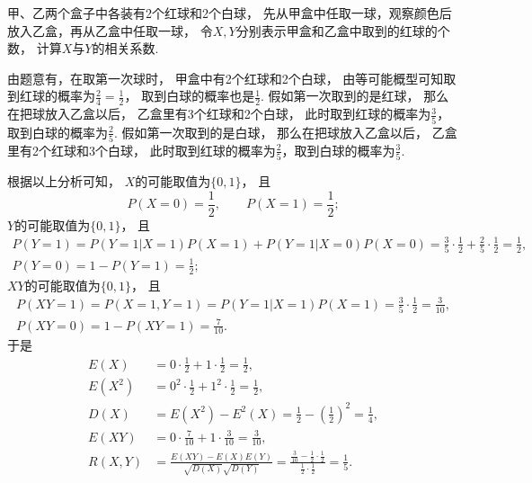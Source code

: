 \begin{example}
甲、乙两个盒子中各装有2个红球和2个白球，
先从甲盒中任取一球，观察颜色后放入乙盒，再从乙盒中任取一球，
令\(X,Y\)分别表示甲盒和乙盒中取到的红球的个数，
计算\(X\)与\(Y\)的相关系数.
\begin{solution}
由题意有，在取第一次球时，
甲盒中有2个红球和2个白球，
由等可能概型可知取到红球的概率为\(\frac24 = \frac12\)，
取到白球的概率也是\(\frac12\).
假如第一次取到的是红球，
那么在把球放入乙盒以后，
乙盒里有3个红球和2个白球，
此时取到红球的概率为\(\frac35\)，取到白球的概率为\(\frac25\).
假如第一次取到的是白球，
那么在把球放入乙盒以后，
乙盒里有2个红球和3个白球，
此时取到红球的概率为\(\frac25\)，取到白球的概率为\(\frac35\).

根据以上分析可知，
\(X\)的可能取值为\(\{0,1\}\)，
且\begin{equation*}
	P(X=0) = \frac12,
	\qquad
	P(X=1) = \frac12;
\end{equation*}
\(Y\)的可能取值为\(\{0,1\}\)，
且\begin{gather*}
	P(Y=1) = P(Y=1 \vert X=1) P(X=1) + P(Y=1 \vert X=0) P(X=0)
	= \frac35 \cdot \frac12 + \frac25 \cdot \frac12
	= \frac12, \\
	P(Y=0) = 1 - P(Y=1) = \frac12;
\end{gather*}
\(XY\)的可能取值为\(\{0,1\}\)，
且\begin{gather*}
	P(XY=1)
	= P(X=1,Y=1)
	= P(Y=1 \vert X=1) P(X=1)
	= \frac35 \cdot \frac12
	= \frac3{10}, \\
	P(XY=0)
	= 1 - P(XY=1)
	= \frac7{10}.
\end{gather*}
于是\begin{align*}
	E(X) &= 0 \cdot \frac12 + 1 \cdot \frac12 = \frac12, \\
	E(X^2) &= 0^2 \cdot \frac12 + 1^2 \cdot \frac12 = \frac12, \\
	D(X) &= E(X^2) - E^2(X) = \frac12 - \left( \frac12 \right)^2 =  \frac14, \\
	E(XY) &= 0 \cdot \frac7{10} + 1 \cdot \frac3{10} = \frac3{10}, \\
	R(X,Y) &= \frac{E(XY) - E(X) E(Y)}{\sqrt{D(X)} \sqrt{D(Y)}}
	= \frac{\frac3{10} - \frac12 \cdot \frac12}{\frac12 \cdot \frac12}
	= \frac15.
\end{align*}
\end{solution}
\end{example}
